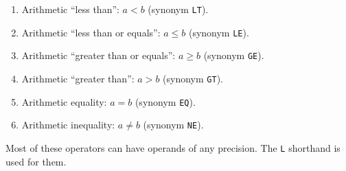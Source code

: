 \begin{enumerate}
(synonym ).
\item {}\newline
Arithmetic ``less than'': $a<b$ (synonym \verb|LT|).
\item {}
\newline
Arithmetic ``less than or equals'': $a\leq b$ (synonym \verb|LE|).
\item {}\newline
Arithmetic ``greater than or equals'': $a\geq b$ (synonym \verb|GE|).
\item {}\newline
Arithmetic ``greater than'': $a>b$ (synonym \verb|GT|).
\item {}\newline
Arithmetic equality: $a=b$ (synonym \verb|EQ|).
\item {}\newline
Arithmetic inequality: $a\neq b$ (synonym \verb|NE|).
\end{enumerate}

Most of these operators can have operands of any precision. The
\verb|L| shorthand is used for them.

